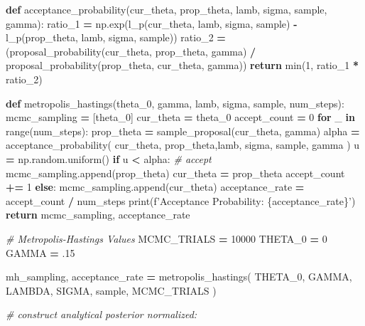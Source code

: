 \documentclass[]{article}
\newenvironment{Shaded}{\begin{snugshade}}{\end{snugshade}}
\newcommand{\BuiltInTok}[1]{#1}
\newcommand{\CommentTok}[1]{\textcolor[rgb]{0.56,0.35,0.01}{\textit{#1}}}
\newcommand{\ControlFlowTok}[1]{\textcolor[rgb]{0.13,0.29,0.53}{\textbf{#1}}}
\newcommand{\DecValTok}[1]{\textcolor[rgb]{0.00,0.00,0.81}{#1}}
\newcommand{\FloatTok}[1]{\textcolor[rgb]{0.00,0.00,0.81}{#1}}
\newcommand{\KeywordTok}[1]{\textcolor[rgb]{0.13,0.29,0.53}{\textbf{#1}}}
\newcommand{\NormalTok}[1]{#1}
\newcommand{\OperatorTok}[1]{\textcolor[rgb]{0.81,0.36,0.00}{\textbf{#1}}}
\newcommand{\SpecialCharTok}[1]{\textcolor[rgb]{0.00,0.00,0.00}{#1}}
\newcommand{\SpecialStringTok}[1]{\textcolor[rgb]{0.31,0.60,0.02}{#1}}
\begin{document}
\begin{Shaded}
\begin{Highlighting}[]
\KeywordTok{def}\NormalTok{ acceptance_probability(cur_theta, prop_theta, lamb, sigma, sample, gamma):}
\NormalTok{    ratio_1 }\OperatorTok{=}\NormalTok{ np.exp(l_p(cur_theta, lamb, sigma, sample)}
                     \OperatorTok{-}\NormalTok{ l_p(prop_theta, lamb, sigma, sample))}
\NormalTok{    ratio_2 }\OperatorTok{=}\NormalTok{ (proposal_probability(cur_theta, prop_theta, gamma)}
               \OperatorTok{/}\NormalTok{ proposal_probability(prop_theta, cur_theta, gamma))}
    \ControlFlowTok{return} \BuiltInTok{min}\NormalTok{(}\DecValTok{1}\NormalTok{, ratio_1 }\OperatorTok{*}\NormalTok{ ratio_2)}


\KeywordTok{def}\NormalTok{ metropolis_hastings(theta_0, gamma, lamb, sigma, sample, num_steps):}
\NormalTok{    mcmc_sampling }\OperatorTok{=}\NormalTok{ [theta_0]}
\NormalTok{    cur_theta }\OperatorTok{=}\NormalTok{ theta_0}
\NormalTok{    accept_count }\OperatorTok{=} \DecValTok{0}
    \ControlFlowTok{for}\NormalTok{ _ }\KeywordTok{in} \BuiltInTok{range}\NormalTok{(num_steps):}
\NormalTok{        prop_theta }\OperatorTok{=}\NormalTok{ sample_proposal(cur_theta, gamma)}
\NormalTok{        alpha }\OperatorTok{=}\NormalTok{ acceptance_probability(}
\NormalTok{            cur_theta, prop_theta,lamb, sigma, sample, gamma}
\NormalTok{        )}
\NormalTok{        u }\OperatorTok{=}\NormalTok{ np.random.uniform()}
        \ControlFlowTok{if}\NormalTok{ u }\OperatorTok{<}\NormalTok{ alpha:  }\CommentTok{# accept}
\NormalTok{            mcmc_sampling.append(prop_theta)}
\NormalTok{            cur_theta }\OperatorTok{=}\NormalTok{ prop_theta}
\NormalTok{            accept_count }\OperatorTok{+=} \DecValTok{1}
        \ControlFlowTok{else}\NormalTok{:}
\NormalTok{            mcmc_sampling.append(cur_theta)}
\NormalTok{    acceptance_rate }\OperatorTok{=}\NormalTok{ accept_count }\OperatorTok{/}\NormalTok{ num_steps}
    \BuiltInTok{print}\NormalTok{(}\SpecialStringTok{f'Acceptance Probability: }\SpecialCharTok{\{}\NormalTok{acceptance_rate}\SpecialCharTok{\}}\SpecialStringTok{'}\NormalTok{)}
    \ControlFlowTok{return}\NormalTok{ mcmc_sampling, acceptance_rate}


\CommentTok{# Metropolis-Hastings Values}
\NormalTok{MCMC_TRIALS }\OperatorTok{=} \DecValTok{10000}
\NormalTok{THETA_0 }\OperatorTok{=} \DecValTok{0}
\NormalTok{GAMMA }\OperatorTok{=} \FloatTok{.15}

\NormalTok{mh_sampling, acceptance_rate }\OperatorTok{=}\NormalTok{ metropolis_hastings(}
\NormalTok{    THETA_0, GAMMA, LAMBDA, SIGMA, sample, MCMC_TRIALS}
\NormalTok{)}

\CommentTok{# construct analytical posterior normalized:}
\end{Highlighting}
\end{Shaded}
\end{document}

